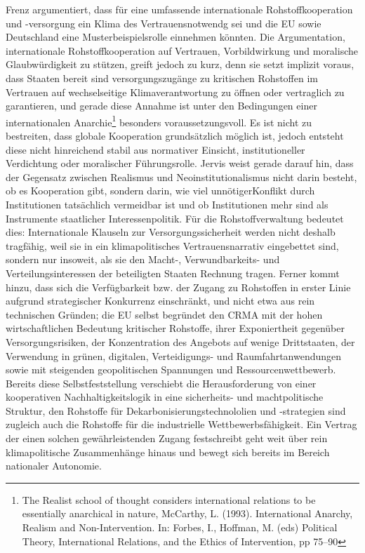 \documentclass[12pt,a4paper,oneside]{book} %
\begin{document}
{Frenz argumentiert, dass für eine umfassende internationale Rohstoffkooperation und -versorgung ein \glqq Klima des Vertrauens\grqq notwendg sei und die EU sowie Deutschland eine Musterbeispielsrolle einnehmen könnten.\autocite{Frenz 2025, S. 1036}  Die Argumentation, internationale Rohstoffkooperation auf Vertrauen, Vorbildwirkung und moralische Glaubwürdigkeit zu stützen, greift jedoch zu kurz, denn sie setzt implizit voraus, dass Staaten bereit sind versorgungszugänge zu kritischen Rohstoffen im Vertrauen auf wechselseitige Klimaverantwortung zu öffnen oder vertraglich zu garantieren, und gerade diese Annahme ist unter den Bedingungen einer \glqq internationalen Anarchie\grqq\footnote{\glqq The Realist school of thought considers international relations to be essentially anarchical in nature\grqq, McCarthy, L. (1993). International Anarchy, Realism and Non-Intervention. In: Forbes, I., Hoffman, M. (eds) Political Theory, International Relations, and the Ethics of Intervention, pp 75–90} besonders voraussetzungsvoll. Es ist nicht zu bestreiten, dass globale Kooperation grundsätzlich möglich ist, jedoch entsteht diese nicht hinreichend stabil aus normativer Einsicht, institutioneller Verdichtung oder moralischer Führungsrolle. Jervis weist gerade darauf hin, dass der Gegensatz zwischen Realismus und Neoinstitutionalismus nicht darin besteht, ob es Kooperation gibt, sondern darin, wie viel \glqq unnötiger\grqq  Konflikt durch Institutionen tatsächlich vermeidbar ist und ob Institutionen mehr sind als Instrumente staatlicher Interessenpolitik.\autocite{Realism, Neoliberalism, and Cooperation: Understanding the Debate Robert Jervis} Für die Rohstoffverwaltung bedeutet dies: Internationale Klauseln zur Versorgungssicherheit werden nicht deshalb tragfähig, weil sie in ein klimapolitisches Vertrauensnarrativ eingebettet sind, sondern nur insoweit, als sie den Macht-, Verwundbarkeits- und Verteilungsinteressen der beteiligten Staaten Rechnung tragen.
Ferner kommt hinzu, dass sich die Verfügbarkeit bzw. der Zugang zu Rohstoffen in erster Linie aufgrund strategischer Konkurrenz einschränkt, und nicht etwa aus rein technischen Gründen; die EU selbst begründet den CRMA mit der hohen wirtschaftlichen Bedeutung kritischer Rohstoffe, ihrer Exponiertheit gegenüber Versorgungsrisiken, der Konzentration des Angebots auf wenige Drittstaaten, der Verwendung in grünen, digitalen, Verteidigungs- und Raumfahrtanwendungen sowie mit steigenden geopolitischen Spannungen und Ressourcenwettbewerb. Bereits diese Selbstfeststellung verschiebt die Herausforderung von einer kooperativen Nachhaltigkeitslogik in eine sicherheits- und machtpolitische Struktur, den Rohstoffe für Dekarbonisierungstechnololien und -strategien sind zugleich auch die Rohstoffe für die industrielle Wettbewerbsfähigkeit. Ein Vertrag der einen solchen gewährleistenden Zugang festschreibt geht weit über rein klimapolitische Zusammenhänge hinaus und bewegt sich bereits im Bereich nationaler Autonomie.
}
\end{document}
